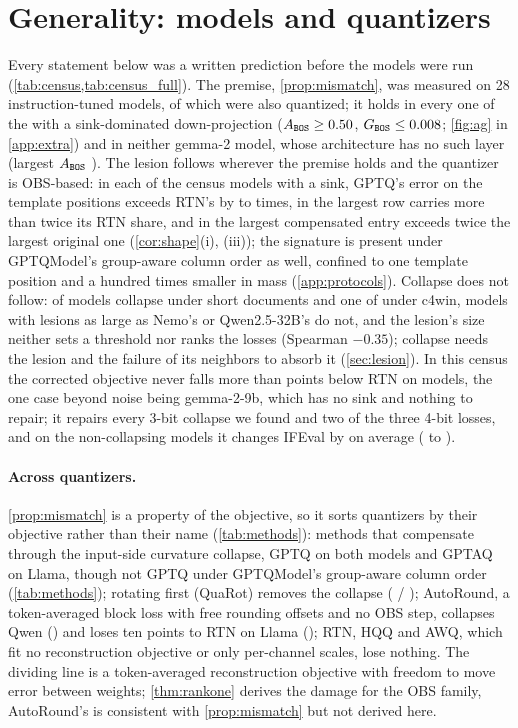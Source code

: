 \section{Generality: models and quantizers}
\label{sec:universality}
Every statement below was a written prediction before the models were run (\cref{tab:census,tab:census_full}).
The premise, \cref{prop:mismatch}, was measured on 28 instruction-tuned models, \nCensus{} of which were also quantized; it holds in every one of the \nSink{} with a sink-dominated down-projection ($A_{\texttt{BOS}}\ge0.50$, $G_{\texttt{BOS}}\le0.008$; \cref{fig:ag} in \cref{app:extra}) and in neither gemma-2 model, whose architecture has no such layer (largest $A_{\texttt{BOS}}$ \GemmaAbosMax{}).
The lesion follows wherever the premise holds and the quantizer is OBS-based: in each of the \nSinkStats{} census models with a sink, GPTQ's error on the template positions exceeds RTN's by \LesionRatioMin{} to \LesionRatioMax{} times, in \nRowConc{} the largest row carries more than twice its RTN share, and in \nClipOver{} the largest compensated entry exceeds twice the largest original one (\cref{cor:shape}(i), (iii)); the signature is present under GPTQModel's group-aware column order as well, confined to one template position and a hundred times smaller in mass (\cref{app:protocols}).
Collapse does not follow: \nCollapse{} of \nCensus{} models collapse under short documents and one of \nWin{} under c4win, models with lesions as large as Nemo's or Qwen2.5-32B's do not, and the lesion's size neither sets a threshold nor ranks the losses (Spearman $-0.35$); collapse needs the lesion and the failure of its neighbors to absorb it (\cref{sec:lesion}).
In this census the corrected objective never falls more than \CorrWorstVsRTN{} points below RTN on \nCorr{} models, the one case beyond noise being gemma-2-9b, which has no sink and nothing to repair; it repairs every 3-bit collapse we found and two of the three 4-bit losses, and on the \nHealthy{} non-collapsing models it changes IFEval by \CorrHealthyMean{} on average (\CorrHealthyWorst{} to \CorrHealthyBest{}).

\paragraph{Across quantizers.}
\cref{prop:mismatch} is a property of the objective, so it sorts quantizers by their objective rather than their name (\cref{tab:methods}): methods that compensate through the input-side curvature collapse, GPTQ on both models and GPTAQ on Llama, though not GPTQ under GPTQModel's group-aware column order (\cref{tab:methods}); rotating first (QuaRot) removes the collapse (\LrotIF{} / \QrotIF{}); AutoRound, a token-averaged block loss with free rounding offsets and no OBS step, collapses Qwen (\QarIF{}) and loses ten points to RTN on Llama (\LarIF{}); RTN, HQQ \citep{badri2023hqq} and AWQ, which fit no reconstruction objective or only per-channel scales, lose nothing.
The dividing line is a token-averaged reconstruction objective with freedom to move error between weights; \cref{thm:rankone} derives the damage for the OBS family, AutoRound's is consistent with \cref{prop:mismatch} but not derived here.
